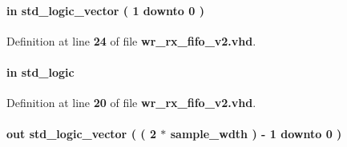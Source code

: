 \paragraph[{ch\+\_\+en}]{ {\bfseries \textcolor{keywordflow}{in}\textcolor{vhdlchar}{ }} {\bfseries \textcolor{comment}{std\+\_\+logic\+\_\+vector}\textcolor{vhdlchar}{ }\textcolor{vhdlchar}{(}\textcolor{vhdlchar}{ }\textcolor{vhdlchar}{ } \textcolor{vhdldigit}{1} \textcolor{vhdlchar}{ }\textcolor{keywordflow}{downto}\textcolor{vhdlchar}{ }\textcolor{vhdlchar}{ } \textcolor{vhdldigit}{0} \textcolor{vhdlchar}{ }\textcolor{vhdlchar}{)}\textcolor{vhdlchar}{ }} \hspace{0.3cm}{\ttfamily [Port]}}\label{classwr__rx__fifo__v2_a6494f316f504075c4ccf47146756d576}


Definition at line {\bf 24} of file {\bf wr\+\_\+rx\+\_\+fifo\+\_\+v2.\+vhd}.

\paragraph[{clk}]{ {\bfseries \textcolor{keywordflow}{in}\textcolor{vhdlchar}{ }} {\bfseries \textcolor{comment}{std\+\_\+logic}\textcolor{vhdlchar}{ }} \hspace{0.3cm}{\ttfamily [Port]}}\label{classwr__rx__fifo__v2_a4a4609c199d30b3adebbeb3a01276ec5}


Definition at line {\bf 20} of file {\bf wr\+\_\+rx\+\_\+fifo\+\_\+v2.\+vhd}.

\paragraph[{diq}]{ {\bfseries \textcolor{keywordflow}{out}\textcolor{vhdlchar}{ }} {\bfseries \textcolor{comment}{std\+\_\+logic\+\_\+vector}\textcolor{vhdlchar}{ }\textcolor{vhdlchar}{(}\textcolor{vhdlchar}{ }\textcolor{vhdlchar}{(}\textcolor{vhdlchar}{ }\textcolor{vhdlchar}{ } \textcolor{vhdldigit}{2} \textcolor{vhdlchar}{$\ast$}\textcolor{vhdlchar}{ }\textcolor{vhdlchar}{ }\textcolor{vhdlchar}{ }{\bfseries {\bf sample\+\_\+wdth}} \textcolor{vhdlchar}{ }\textcolor{vhdlchar}{)}\textcolor{vhdlchar}{ }\textcolor{vhdlchar}{-\/}\textcolor{vhdlchar}{ } \textcolor{vhdldigit}{1} \textcolor{vhdlchar}{ }\textcolor{keywordflow}{downto}\textcolor{vhdlchar}{ }\textcolor{vhdlchar}{ } \textcolor{vhdldigit}{0} \textcolor{vhdlchar}{ }\textcolor{vhdlchar}{)}\textcolor{vhdlchar}{ }} \hspace{0.3cm}{\ttfamily [Port]}}\label{classwr__rx__fifo__v2_a32f91af3e8298457411dba5c7a3cda3c}


